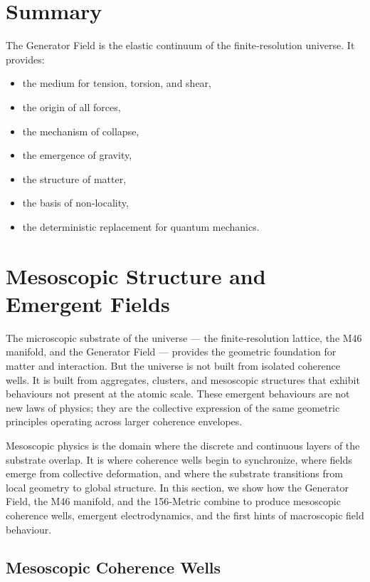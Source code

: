 \documentclass[reprint,amsmath,amssymb,aps,prl,floatfix]{revtex4-2}
\begin{document}
\begin{itemize}
\section{Summary}

The Generator Field is the elastic continuum of the finite‑resolution universe.  
It provides:
\begin{itemize}
\item the medium for tension, torsion, and shear,  
\item the origin of all forces,  
\item the mechanism of collapse,  
\item the emergence of gravity,  
\item the structure of matter,  
\item the basis of non‑locality,  
\item the deterministic replacement for quantum mechanics.
\end{itemize}

\section{Mesoscopic Structure and Emergent Fields}

The microscopic substrate of the universe — the finite‑resolution lattice, the M46 manifold, and the Generator Field — provides the geometric foundation for matter and interaction. But the universe is not built from isolated coherence wells. It is built from aggregates, clusters, and mesoscopic structures that exhibit behaviours not present at the atomic scale. These emergent behaviours are not new laws of physics; they are the collective expression of the same geometric principles operating across larger coherence envelopes.
\medskip

Mesoscopic physics is the domain where the discrete and continuous layers of the substrate overlap. It is where coherence wells begin to synchronize, where fields emerge from collective deformation, and where the substrate transitions from local geometry to global structure. In this section, we show how the Generator Field, the M46 manifold, and the 156‑Metric combine to produce mesoscopic coherence wells, emergent electrodynamics, and the first hints of macroscopic field behaviour.

\subsection{Mesoscopic Coherence Wells}


\end{itemize}
\end{document}
